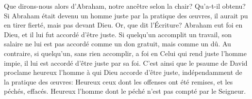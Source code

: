 Que dirons-nous alors d’Abraham,
	notre ancêtre selon la chair?
	Qu’a-t-il obtenu?
Si Abraham était devenu un homme juste par la pratique des œuvres,
	il aurait pu en tirer fierté, mais pas devant Dieu.
Or, que dit l’Écriture?
	Abraham eut foi en Dieu, et il lui fut accordé d’être juste.
Si quelqu’un accomplit un travail,
	son salaire ne lui est pas accordé comme un don gratuit, mais comme un dû.
Au contraire, si quelqu’un, sans rien accomplir,
		a foi en Celui qui rend juste l’homme impie,
	il lui est accordé d’être juste par sa foi.
C’est ainsi que le psaume de David proclame heureux
		l’homme à qui Dieu accorde d’être juste,
	indépendamment de la pratique des œuvres:
	Heureux ceux dont les offenses ont été remises, et les péchés, effacés.
	Heureux l’homme dont le péché n’est pas compté par le Seigneur.
